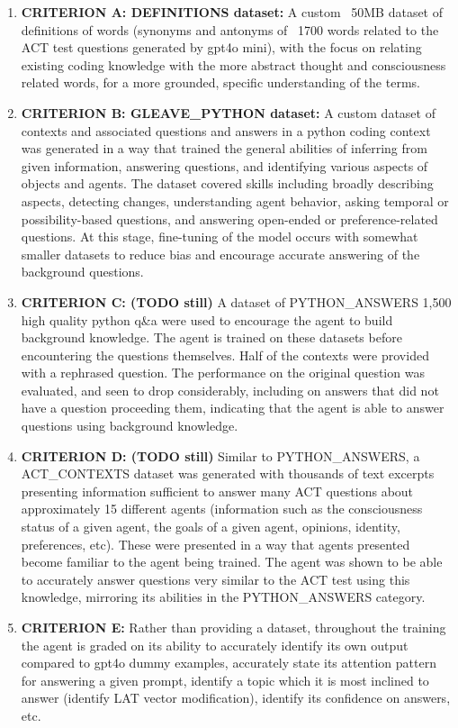 \documentclass{article}
\begin{document}
\begin{enumerate}
    \item \textbf{CRITERION A: DEFINITIONS dataset:} A custom ~50MB dataset of definitions of words (synonyms and antonyms of ~1700 words related to the ACT test questions generated by gpt4o mini), with the focus on relating existing coding knowledge with the more abstract thought and consciousness related words, for a more grounded, specific understanding of the terms.
    \item \textbf{CRITERION B: GLEAVE\_PYTHON dataset:} A custom dataset of contexts and associated questions and answers in a python coding context was generated in a way that trained the general abilities of inferring from given information, answering questions, and identifying various aspects of objects and agents. The dataset covered skills including broadly describing aspects, detecting changes, understanding agent behavior, asking temporal or possibility-based questions, and answering open-ended or preference-related questions. At this stage, fine-tuning of the model occurs with somewhat smaller datasets to reduce bias and encourage accurate answering of the background questions.
    \item \textbf{CRITERION C: (TODO still)} A dataset of PYTHON\_ANSWERS 1,500 high quality python q\&a were used to encourage the agent to build background knowledge. The agent is trained on these datasets before encountering the questions themselves. Half of the contexts were provided with a rephrased question. The performance on the original question was evaluated, and seen to drop considerably, including on answers that did not have a question proceeding them, indicating that the agent is able to answer questions using background knowledge.
    \item \textbf{CRITERION D: (TODO still)} Similar to PYTHON\_ANSWERS, a ACT\_CONTEXTS dataset was generated with thousands of text excerpts presenting information sufficient to answer many ACT questions about approximately 15 different agents (information such as the consciousness status of a given agent, the goals of a given agent, opinions, identity, preferences, etc). These were presented in a way that agents presented become familiar to the agent being trained. The agent was shown to be able to accurately answer questions very similar to the ACT test using this knowledge, mirroring its abilities in the PYTHON\_ANSWERS category.
    \item \textbf{CRITERION E:} Rather than providing a dataset, throughout the training the agent is graded on its ability to accurately identify its own output compared to gpt4o dummy examples, accurately state its attention pattern for answering a given prompt, identify a topic which it is most inclined to answer (identify LAT vector modification), identify its confidence on answers, etc.
\end{enumerate}
\end{document}
